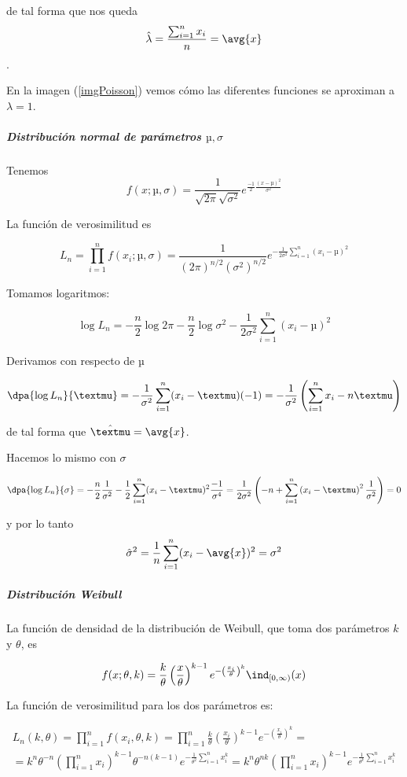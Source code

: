 \documentclass{apuntes}
\begin{document}
de tal forma que nos queda \[ \hat{\lambda} = \frac{\sum_{i=1}^n x_i}{n} = \avg{x} \].

En la imagen (\ref{imgPoisson}) vemos cómo las diferentes funciones se aproximan a $\lambda = 1$.


\subparagraph{Distribución normal de parámetros $µ,\sigma$} Tenemos \[f(x;µ,\sigma) = \frac{1}{\sqrt{2\pi}\sqrt{\sigma^2}}e^{\frac{-1}{2}\frac{(x-µ)^2}{\sigma^2}} \]

La función de verosimilitud es

\[ L_n = \prod_{i=1}^n f(x_i;µ,\sigma) = \frac{1}{(2\pi)^{n/2} (\sigma^2)^{n/2}} e^{-\frac{1}{2\sigma^2}\sum_{i=1}^n(x_i-µ)^2} \]

Tomamos logaritmos:

\[ \log L_n = - \frac{n}{2}\log 2\pi - \frac{n}{2} \log \sigma^2 - \frac{1}{2\sigma^2} \sum_{i=1}^n(x_i-µ)^2 \]

Derivamos con respecto de $µ$

\[ \dpa{\log L_n}{µ} = - \frac{1}{\sigma^2} \sum_{i=1}^n(x_i-µ)(-1) = - \frac{1}{\sigma^2}\left( \sum_{i=1}^nx_i - nµ\right) \]

de tal forma que $\hat{µ} = \avg{x}$.

Hacemos lo mismo con $\sigma$

\[ \dpa{\log L_n}{\sigma} = - \frac{n}{2}\frac{1}{\sigma^2} - \frac{1}{2}\sum_{i=1}^n(x_i-µ)^2 \frac{-1}{\sigma^4} = \frac{1}{2\sigma^2}\left(-n + \sum_{i=1}^n\left(x_i-µ\right)^2\frac{1}{\sigma^2}\right) = 0 \]

y por lo tanto \[\hat{\sigma}^2 = \frac{1}{n}\sum_{i=1}^n(x_i-\avg{x})^2 = \sigma^2 \]

\subparagraph{Distribución Weibull} La función de densidad de la distribución de Weibull, que toma dos parámetros $k$ y $\theta$, es

\[ f(x; \theta, k) = \frac{k}{\theta}\left(\frac{x}{\theta}\right)^{k-1}e^{-\left(\frac{x_i}{\theta}\right)^k}\ind_{[0, \infty)}(x) \]

La función de verosimilitud para los dos parámetros es:

\begin{gather*}
 L_n(k,\theta) = \prod_{i=1}^n f(x_i, \theta, k) = \prod_{i=1}^n \frac{k}{\theta}\left(\frac{x_i}{\theta}\right)^{k-1}e^{-\left(\frac{x_i}{\theta}\right)^k} = \\
 = k^n \theta^{-n}\left(\prod_{i=1}^n x_i\right)^{k-1} \theta^{-n(k-1)} e^{-\frac{1}{\theta^2}\sum_{i=1}^nx_i^k} = k^n\theta^{nk} \left(\prod_{i=1}^n x_i\right)^{k-1} e^{-\frac{1}{\theta^k}\sum_{i=1}^nx_i^k}
 \end{gather*}
\end{document}
